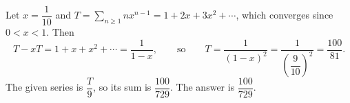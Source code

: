 Let $x=\dfrac{1}{10}$ and $T=\displaystyle\sum_{n\ge1}nx^{n-1}=1+2x+3x^2+\cdots$, which converges since $0<x<1$. Then
\[
T-xT=1+x+x^2+\cdots=\dfrac{1}{1-x},\qquad\text{so}\qquad T=\dfrac{1}{(1-x)^2}=\dfrac{1}{\left(\dfrac{9}{10}\right)^2}=\dfrac{100}{81}.
\]
The given series is $\dfrac {T}{9}$, so its sum is $\dfrac{100}{729}$. The answer is $\boxed{\dfrac{100}{729}}$.
